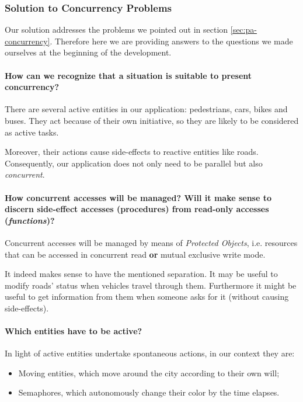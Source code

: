 \subsubsection{Solution to Concurrency Problems}

Our solution addresses the problems we pointed out in section 
\ref{sec:pa-concurrency}.
Therefore here we are providing answers to the questions 
we made ourselves at the beginning of the development.

\paragraph{How can we recognize that a situation is suitable to present
concurrency?}
There are several active entities in our application: 
pedestrians, cars, bikes and buses. 
They act because of their own initiative, 
so they are likely to be considered as active tasks.

Moreover, their actions cause side-effects to reactive entities like roads.
Consequently, our application does not only need to be parallel 
but also \textit{concurrent}.

\paragraph{How concurrent accesses will be managed? Will it make sense to
discern side-effect accesses (procedures) from read-only accesses
(\textit{functions})?} 
Concurrent accesses will be managed by means of \textit{Protected Objects}, 
i.e. resources that can be accessed in concurrent read
\textbf{or} mutual exclusive write mode.

It indeed makes sense to have the mentioned separation. 
It may be useful to modify roads' status when vehicles travel through them. 
Furthermore it might be useful to get information from them 
when someone asks for it (without causing side-effects).

\paragraph{Which entities have to be active?} 
In light of active entities undertake spontaneous actions, in our context they are:
\begin{itemize}
  \item Moving entities, which move around the city according to their own will;
  \item Semaphores, which autonomously change their color by the time elapses.
\end{itemize}

